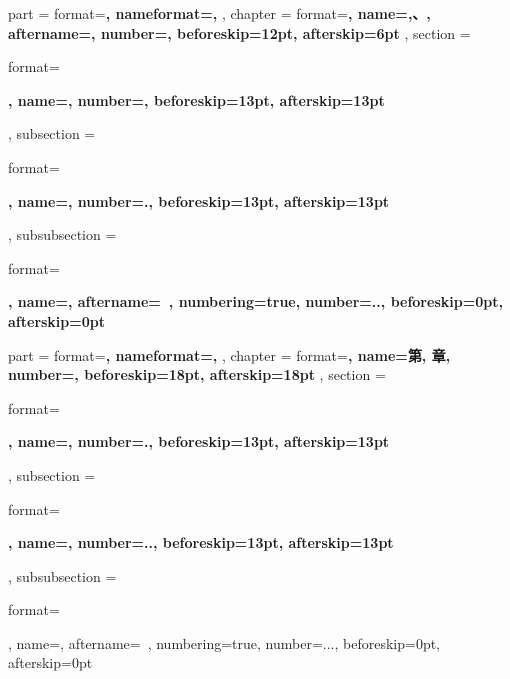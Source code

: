 {
    \ctexset
    {
        part =
        {
            format=\centering{}\bfseries,
            nameformat=\centering\heiti\fontsize{48}{48}\bfseries,
        },
        chapter =
        {
            format=\centering{}\bfseries,
            name={,、},
            aftername=,
            number=,
            beforeskip=12pt,
            afterskip=6pt
        },
        section =
        {
            format=\raggedright{}\bfseries,
            name={},
            number=,
            beforeskip=13pt,
            afterskip=13pt
        },
        subsection =
        {
            format=\raggedright{}\bfseries,
            name={},
            number=.,
            beforeskip=13pt,
            afterskip=13pt
        },
        subsubsection =
        {
            format=\raggedright{}\bfseries,
            name={},
            aftername=~,
            numbering=true,
            number=..,
            beforeskip=0pt,
            afterskip=0pt
        }
    }
}
{
    \ctexset
    {
        part =
        {
            format=\centering{}\bfseries,
            nameformat=\centering\heiti\fontsize{48}{48}\bfseries,
        },
        chapter =
        {
            format=\centering{}\bfseries,
            name={第, 章},
            number=,
            beforeskip=18pt,
            afterskip=18pt
        },
        section =
        {
            format=\raggedright{}\bfseries,
            name={},
            number=.,
            beforeskip=13pt,
            afterskip=13pt
        },
        subsection =
        {
            format=\raggedright{}\bfseries,
            name={},
            number=..,
            beforeskip=13pt,
            afterskip=13pt
        },
        subsubsection =
        {
            format=\raggedright{},
            name={},
            aftername=~,
            numbering=true,
            number=...,
            beforeskip=0pt,
            afterskip=0pt
        }
    }
}

\makeatletter
{}
\makeatother

